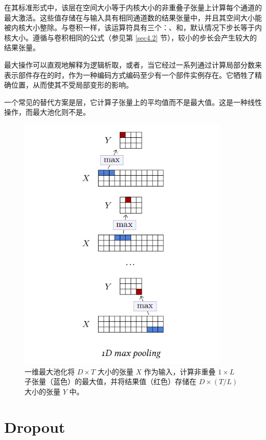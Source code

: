 在其标准形式中，该层在空间大小等于内核大小的非重叠子张量上计算每个通道的最大激活。这些值存储在与输入具有相同通道数的结果张量中，并且其空间大小能被内核大小整除。与卷积一样，该运算符具有三个：、和，默认情况下步长等于内核大小。遵循与卷积相同的公式（参见第 \ref{sec4.2} 节），较小的步长会产生较大的结果张量。

最大操作可以直观地解释为逻辑析取，或者，当它经过一系列通过计算局部分数来表示部件存在的时，作为一种编码方式编码至少有一个部件实例存在。它牺牲了精确位置，从而使其不受局部变形的影响。

一个常见的替代方案是层，它计算子张量上的平均值而不是最大值。这是一种线性操作，而最大池化则不是。

\begin{figure}
    \centering
    \includegraphics[width=0.9\textwidth]{fig/fig4.6.png}
    \caption[最大池化]{一维最大池化将 $D \times T$ 大小的张量 $X$ 作为输入，计算非重叠 $1 \times L$ 子张量（蓝色）的最大值，并将结果值（红色）存储在 $D \times (T / L)$ 大小的张量 $Y$ 中。}
    \label{fig4.6}
\end{figure}

\section{Dropout}\label{sec4.5}


